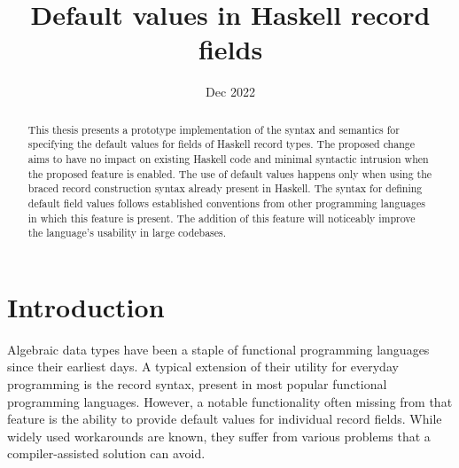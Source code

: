 \documentclass[en]{pracamgr}
\title{Default values in Haskell record fields}
\date{Dec 2022}
\begin{document}
\maketitle

\begin{abstract}
This thesis presents a prototype implementation of the syntax and semantics for specifying
the default values for fields of Haskell record types. The proposed change aims to have no 
impact on existing Haskell code and minimal syntactic intrusion when the proposed feature 
is enabled. The use of default values happens only when using the braced record construction syntax 
already present in Haskell. The syntax for defining default field values follows established
conventions from other programming languages in which this feature is present. The addition
of this feature will noticeably improve the language's usability in large codebases.
\end{abstract}


\tableofcontents

\chapter*{Introduction}

Algebraic data types have been a staple of functional programming languages since their earliest days.
A typical extension of their utility for everyday programming is the record syntax, present in most popular functional programming languages.
However, a notable functionality often missing from that feature is the ability to provide default values for individual record fields.
While widely used workarounds are known, they suffer from various problems that a compiler-assisted solution can avoid.
\end{document}

